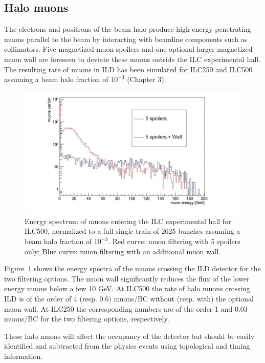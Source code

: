 \subsection{Halo muons}

The electrons and positrons of the beam halo produce high-energy penetrating muons parallel to the beam by interacting with beamline components such as collimators. Five magnetized muon spoilers and one optional larger magnetized muon wall are foreseen to deviate these muons outside the ILC experimental hall. The resulting rate of muons in ILD has been simulated for ILC250 and ILC500 assuming a beam halo fraction of $10^{-3}$ (Chapter 3). 

\begin{figure}[t!]
\includegraphics[width=1.0\hsize]{Integration/fig/BG_muons.jpg}
\caption{\label{fig:integration:muons}Energy spectrum of muons entering the ILC experimental hall for ILC500, normalized to a full single train of 2625 bunches assuming a beam halo fraction of $10^{-3}$. Red curve: muon filtering with 5 spoilers only; Blue curve: muon filtering with an additional muon wall.}
\end{figure}

Figure~\ref{fig:integration:muons} shows the energy spectra of the muons crossing the ILD detector for the two filtering options. The muon wall significantly reduces the flux of the lower energy muons below a few 10 GeV. At ILC500 the rate of halo muons crossing ILD is of the order of 4 (resp. 0.6) muons/BC without (resp. with) the optional muon wall. At ILC250 the corresponding numbers are of the order 1 and 0.03 muons/BC for the two filtering options, respectively.

These halo muons will affect the occupancy of the detector but should be easily identified and subtracted from the physics events using topological and timing information.


